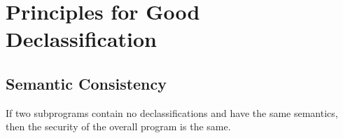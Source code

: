 \documentclass[11pt]{article}
\begin{document}
\section{Principles for Good Declassification}
\subsection{Semantic Consistency}
If two subprograms contain no declassifications and have the same semantics, then the security of the overall program is the same. 
\subsection{}
\subsection{}
\subsection{}
\end{document}
